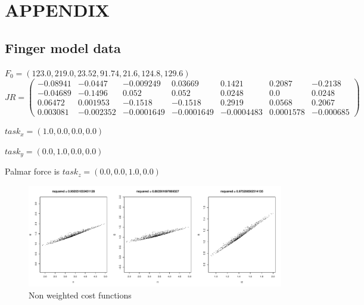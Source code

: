 \section{APPENDIX}

\subsection{Finger model data}
$F_0 = (123.0, 219.0, 23.52, 91.74,	21.6, 124.8, 129.6)$\\
$
JR = 
\begin{pmatrix}
-0.08941 & -0.0447 & -0.009249 & 0.03669 & 0.1421 & 0.2087 & -0.2138 \\
-0.04689 & -0.1496 & 0.052 &0.052 & 0.0248 & 0.0 & 0.0248 \\ 
0.06472 & 0.001953 & -0.1518 &-0.1518 & 0.2919 & 0.0568 & 0.2067 \\
0.003081 & -0.002352 & -0.0001649 & -0.0001649 & -0.0004483 & 0.0001578 & -0.000685
\end{pmatrix}$

$task_x = (1.0,0.0,0.0,0.0)$

$task_y = (0.0,1.0,0.0,0.0)$

Palmar force is $task_z = (0.0,0.0,1.0,0.0)$


\begin{figure}[h]
\centering
\includegraphics[width=\textwidth,page=1]{figs/cost_function_scatterplots.pdf}
\caption{Non weighted cost functions}
\label{fig:unweighted_cost_functions}
\end{figure}

